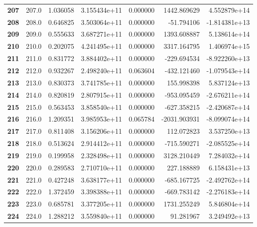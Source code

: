 \documentclass{report}[12pt]
\begin{document}
\begin{center}
\begin{tabular}{lrrrrrr}
\textbf{207 } &          207.0 &   1.036058 &  3.155434e+11 &    0.000000 &  1442.869629 &  4.552879e+14 \\
\textbf{208 } &          208.0 &   0.646825 &  3.503064e+11 &    0.000000 &   -51.794106 & -1.814381e+13 \\
\textbf{209 } &          209.0 &   0.555633 &  3.687271e+11 &    0.000000 &  1393.608887 &  5.138614e+14 \\
\textbf{210 } &          210.0 &   0.202075 &  4.241495e+11 &    0.000000 &  3317.164795 &  1.406974e+15 \\
\textbf{211 } &          211.0 &   0.831772 &  3.884402e+11 &    0.000000 &  -229.694534 & -8.922260e+13 \\
\textbf{212 } &          212.0 &   0.932267 &  2.498240e+11 &    0.063604 &  -432.121460 & -1.079543e+14 \\
\textbf{213 } &          213.0 &   0.830373 &  3.741785e+11 &    0.000000 &   155.998398 &  5.837124e+13 \\
\textbf{214 } &          214.0 &   0.820819 &  2.807915e+11 &    0.000000 &  -953.095459 & -2.676211e+14 \\
\textbf{215 } &          215.0 &   0.563453 &  3.858540e+11 &    0.000000 &  -627.358215 & -2.420687e+14 \\
\textbf{216 } &          216.0 &   1.209351 &  3.985953e+11 &    0.065784 & -2031.903931 & -8.099074e+14 \\
\textbf{217 } &          217.0 &   0.811408 &  3.156206e+11 &    0.000000 &   112.072823 &  3.537250e+13 \\
\textbf{218 } &          218.0 &   0.513624 &  2.914412e+11 &    0.000000 &  -715.590271 & -2.085525e+14 \\
\textbf{219 } &          219.0 &   0.199958 &  2.328498e+11 &    0.000000 &  3128.210449 &  7.284032e+14 \\
\textbf{220 } &          220.0 &   0.289583 &  2.710710e+11 &    0.000000 &   227.188889 &  6.158431e+13 \\
\textbf{221 } &          221.0 &   0.427248 &  3.638177e+11 &    0.000000 &  -685.167725 & -2.492762e+14 \\
\textbf{222 } &          222.0 &   1.372459 &  3.398388e+11 &    0.000000 &  -669.783142 & -2.276183e+14 \\
\textbf{223 } &          223.0 &   0.685781 &  3.377205e+11 &    0.000000 &  1731.255249 &  5.846804e+14 \\
\textbf{224 } &          224.0 &   1.288212 &  3.559840e+11 &    0.000000 &    91.281967 &  3.249492e+13 \\

\end{tabular}
\end{center}
\end{document}
